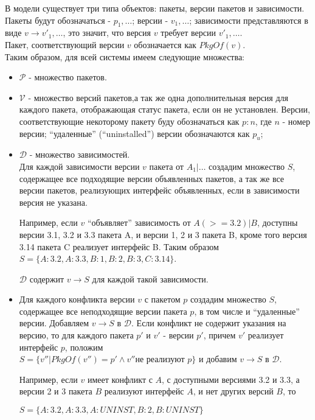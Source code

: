 В модели существует три типа объектов: пакеты, версии пакетов и зависимости.
Пакеты будут обозначаться - $p_1, \dots$; версии - $v_1, \dots$; зависимости 
представляются в виде $v \to {v'_1, \dots}$, это значит, что версия $v$ требует
версии ${v'_1, \dots}$. \\
Пакет, соответствующий версии $v$ обозначается как $PkgOf(v)$.\\
Таким образом, для всей системы имеем следующие множества:
\begin{itemize}
\item{
$\mathcal{P}$ - множество пакетов.
}
\item{
$\mathcal{V}$ - множество версий пакетов,а так же одна дополнительная версия для каждого пакета,
отображающая статус пакета, если он не установлен. Версии, соответствующие некоторому пакету
буду обозначаться как $p: n$, где $n$ - номер версии; ``удаленные'' (``uninstalled'') версии
обозначаются как $p_u$;
}
\item{
$\mathcal{D}$ - множество зависимостей.\\
 Для каждой зависимости версии $v$ пакета от $A_1 | \dots$
создадим множество $S$, содержащее все подходящие версии объявленных пакетов, 
а так же все версии пакетов, реализующих интерфейс объявленных, если в зависимости 
версия не указана.

Например, если $v$ ``объявляет'' зависимость от $A (>= 3.2) | B$, 
доступны версии 3.1, 3.2 и 3.3 пакета A, и версии 1, 2 и 3 пакета B,
кроме того версия 3.14 пакета C реализует интерфейс B. 
Таким образом $S = \{A:3.2,A:3.3,B:1,B:2,B:3,C:3.14\} $. 

$\mathcal{D}$ содержит $v \to S$ для каждой такой зависимости.
}
\item{
Для каждого конфликта версии $v$ с пакетом $p$ создадим множество $S$, содержащее все
неподходящие версии пакета $p$, в том числе и ``удаленные'' версии. Добавляем $v \to S$
в $\mathcal{D}$. Если конфликт не содержит указания на версию, то для каждого пакета $p'$ и $v'$ -
версии $p'$, причем $v'$ реализует интерфейс $p$, положим \\
$S = \{v''|PkgOf(v'') = p' \wedge v'' \text{не реализуют $p$}\} $
и добавим $v \to S$ в $\mathcal{D}$.

Например, если $v$ имеет конфликт с $A$, с доступными версиями 3.2 и 3.3, а версии 2 и 3 пакета $B$
реализуют интерфейс $A$, и нет других версий $B$, то

$S = \{A:3.2, A:3.3, A:UNINST, B:2, B:UNINST\}$
}
\end{itemize}


